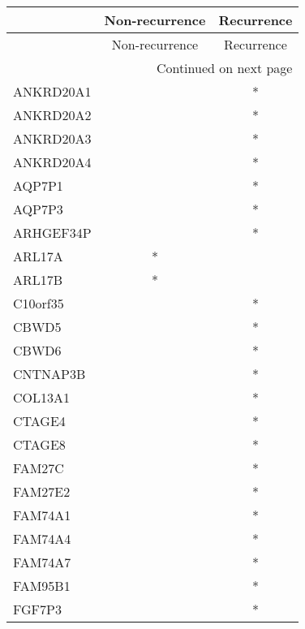 \begin{longtable}{lcc}
\toprule
{} & Non-recurrence & Recurrence \\
\midrule
\endfirsthead

\toprule
{} & Non-recurrence & Recurrence \\
\midrule
\endhead
\midrule
\multicolumn{3}{r}{{Continued on next page}} \\
\midrule
\endfoot

\bottomrule
\endlastfoot
ANKRD20A1          &                &          * \\
ANKRD20A2          &                &          * \\
ANKRD20A3          &                &          * \\
ANKRD20A4          &                &          * \\
AQP7P1             &                &          * \\
AQP7P3             &                &          * \\
ARHGEF34P          &                &          * \\
ARL17A             &              * &            \\
ARL17B             &              * &            \\
C10orf35           &                &          * \\
CBWD5              &                &          * \\
CBWD6              &                &          * \\
CNTNAP3B           &                &          * \\
COL13A1            &                &          * \\
CTAGE4             &                &          * \\
CTAGE8             &                &          * \\
FAM27C             &                &          * \\
FAM27E2            &                &          * \\
FAM74A1            &                &          * \\
FAM74A4            &                &          * \\
FAM74A7            &                &          * \\
FAM95B1            &                &          * \\
FGF7P3             &                &          * \\

\end{longtable}

